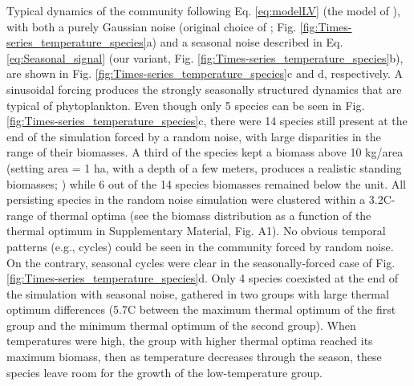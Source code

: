 \documentclass[smallcondensed,referee]{svjour3}       %
\begin{document}
Typical dynamics of the community following Eq. \ref{eq:modelLV}
(the model of \citealp{scranton_coexistence_2016}), with both a purely
Gaussian noise (original choice of \citealp{scranton_coexistence_2016};
Fig. \ref{fig:Times-series_temperature_species}a) and a seasonal
noise described in Eq. \ref{eq:Seasonal_signal} (our variant, Fig.
\ref{fig:Times-series_temperature_species}b), are shown in Fig. \ref{fig:Times-series_temperature_species}c
and d, respectively. A sinusoidal forcing produces the strongly seasonally
structured dynamics that are typical of phytoplankton. Even though
only 5 species can be seen in Fig. \ref{fig:Times-series_temperature_species}c,
there were 14 species still present at the end of the simulation forced
by a random noise, with large disparities in the range of their biomasses.
A third of the species kept a biomass above 10 kg/area (setting area
= 1 ha, with a depth of a few meters, produces a realistic standing
biomasses; \citealp{reynolds2006ecology}) while 6 out of the 14 species
biomasses remained below the unit. All persisting species in the random
noise simulation were clustered within a 3.2\textdegree C-range of thermal optima
(see the biomass distribution as a function of the thermal optimum
in Supplementary Material, Fig. A1). No obvious temporal patterns
(e.g., cycles) could be seen in the community forced by random noise.
On the contrary, seasonal cycles were clear in the seasonally-forced
case of Fig. \ref{fig:Times-series_temperature_species}d. Only 4
species coexisted at the end of the simulation with seasonal noise,
gathered in two groups with large thermal optimum differences (5.7\textdegree C
between the maximum thermal optimum of the first group and the minimum
thermal optimum of the second group). When temperatures were high,
the group with higher thermal optima reached its maximum biomass,
then as temperature decreases through the season, these species leave
room for the growth of the low-temperature group.
\end{document}
